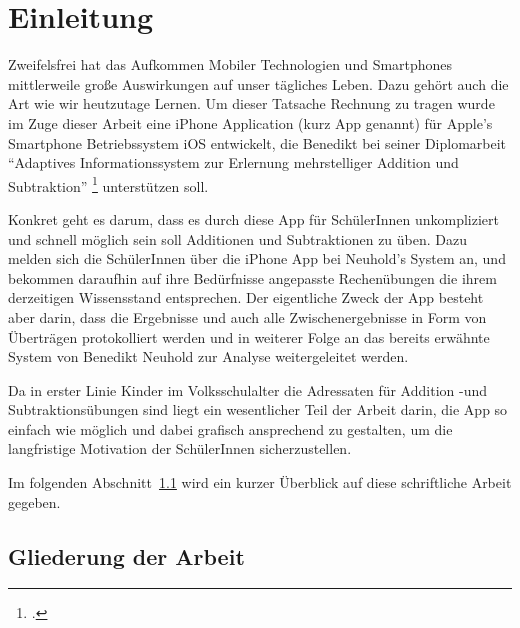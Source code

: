 

\chapter{Einleitung}

Zweifelsfrei hat das Aufkommen Mobiler Technologien und Smartphones mittlerweile große 
Auswirkungen auf unser tägliches Leben. Dazu gehört auch die Art wie wir heutzutage
Lernen. 
Um dieser Tatsache Rechnung zu tragen wurde im Zuge dieser Arbeit eine iPhone Application (kurz App genannt)  für Apple's 
Smartphone Betriebssystem iOS entwickelt, die Benedikt \citeauthor{Neuhold2013} bei seiner Diplomarbeit \enquote{Adaptives Informationssystem zur Erlernung
mehrstelliger Addition und Subtraktion} \footcite{Neuhold2013} unterstützen soll.

Konkret geht es darum, dass es durch diese App für SchülerInnen unkompliziert und schnell möglich sein soll
Additionen und Subtraktionen zu üben. Dazu melden sich die SchülerInnen über die iPhone App bei Neuhold's System an, und 
bekommen daraufhin auf ihre Bedürfnisse angepasste Rechenübungen die ihrem derzeitigen Wissensstand entsprechen.
Der eigentliche Zweck der App besteht aber darin, dass die Ergebnisse und auch 
alle Zwischenergebnisse in Form von Überträgen protokolliert
werden und in weiterer Folge an das bereits erwähnte System von Benedikt
Neuhold zur Analyse weitergeleitet werden.

Da in erster Linie Kinder im Volksschulalter die Adressaten für Addition -und Subtraktionsübungen sind
liegt ein wesentlicher Teil der Arbeit darin, die App so einfach wie möglich und dabei grafisch 
ansprechend zu gestalten, um die langfristige Motivation der SchülerInnen sicherzustellen.

Im folgenden Abschnitt~\ref{sec:Gliederung} wird ein kurzer Überblick auf diese schriftliche Arbeit gegeben.
\section{Gliederung der Arbeit}
\label{sec:Gliederung}

